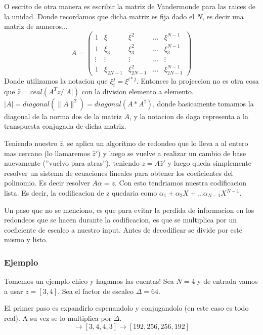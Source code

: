 \documentclass[12pt, oneside]{article}
\begin{document}
O escrito de otra manera es escribir la matriz de Vandermonde para las raices de la unidad.
Donde recordamos que dicha matriz es fija dado el $N$, es decir una matriz de numeros...
\begin{equation*}
    A=
    \begin{pmatrix}
        1 & \xi &  \xi^2 & ... & \xi^{N-1} \\
        1 & \xi_3 & \xi_3^2 & ... & \xi_3^{N-1}\\
        \vdots & \vdots & \vdots & ... & \vdots\\
        1 & \xi_{2N-1} & \xi_{2N-1}^2 & ... & \xi_{2N-1}^{N-1}
    \end{pmatrix}
    \label{eq:vandermonde}
\end{equation*}
Donde utilizamos la notacion que $\xi_i^j=\xi^{i*j}$.
Entonces la projeccion no es otra cosa que $\hat{z} = real(A^Tz/|A|)$ con la division
elemento a elemento.
$|A|=diagonal(\parallel A\parallel^2)= diagonal(A*A^\dagger)$, donde basicamente tomamos la diagonal de
la norma dos de la matriz $A$, y la notacion de daga representa a la transpuesta conjugada de dicha matriz.


Teniendo nuestro $\hat{z}$, se aplica un algoritmo de redondeo que lo lleva a al entero mas cercano
(lo llamaremos $\hat{z}'$) y luego se vuelve a realizar un cambio de base nuevamente (''vuelvo
para atras''),
teniendo $z = A\hat{z}'$ y luego queda simplemente resolver un sistema de ecuaciones lineales para
obtener los coeficientes del polinomio.
Es decir resolver $A\alpha=z$.
Con esto tendriamos nuestra codificacion lista.
Es decir, la codificacion de z quedaria como $\alpha_1 + \alpha_2 X + ... \alpha_{N-1}X^{N-1}$.

Un paso que no se menciono, es que para evitar la perdida de informacion en los redondeos
que se hacen durante la codificacion, es que se multiplica por un coeficiente de
escaleo a nuestro input.
Antes de decodificar se divide por este mismo y listo.


\subsubsection{Ejemplo}

Tomemos un ejemplo chico y hagamos las cuentas!
Sea $N=4$ y de entrada vamos a usar $z=[3,4]$.
Sea el factor de escaleo $\Delta=64$.

El primer paso es expandirlo espenandolo y conjugandolo (en este caso es todo real).
A su vez se lo multiplica por  $\Delta$.
\begin{equation*}
    [3,4]\rightarrow [3,4,4,3] \rightarrow [192, 256, 256, 192]
\end{equation*}
\end{document}
